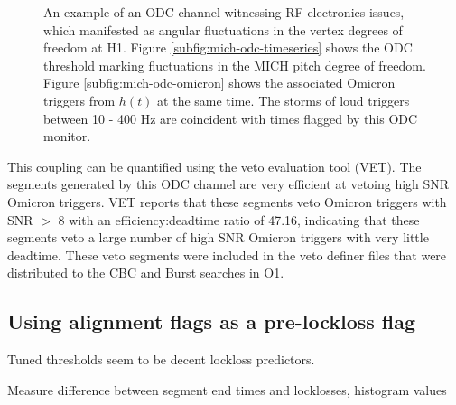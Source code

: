\begin{figure}[ht!]%

\caption[ODC threshold on MICH pitch]{%
         An example of an ODC channel witnessing RF electronics issues, which %
         manifested as angular fluctuations in the vertex degrees of freedom %
         at H1. Figure \ref{subfig:mich-odc-timeseries} shows the ODC threshold %
         marking fluctuations in the MICH pitch degree of freedom. Figure %
         \ref{subfig:mich-odc-omicron} shows the associated Omicron triggers from %
         $h(t)$ at the same time. The storms of loud triggers between 10 - 400 Hz %
         are coincident with times flagged by this ODC monitor.}
\end{figure}\label{fig:mich-odc-example}

This coupling can be quantified using the veto evaluation tool (VET). The 
segments generated by this ODC channel are very efficient at vetoing high SNR 
Omicron triggers. VET reports that these segments veto Omicron triggers with SNR 
$>$ 8 with an efficiency:deadtime ratio of 47.16, indicating that these segments 
veto a large number of high SNR Omicron triggers with very little deadtime. These 
veto segments were included in the veto definer files that were distributed to 
the CBC and Burst searches in O1. 

\subsection{Using alignment flags as a pre-lockloss flag}

Tuned thresholds seem to be decent lockloss predictors.

Measure difference between segment end times and locklosses, histogram values


